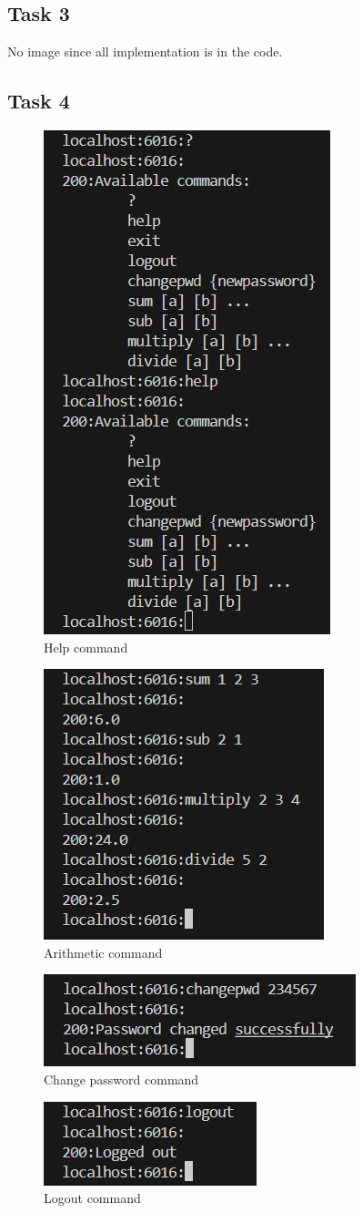 \documentclass[a4paper,12pt]{article}
\begin{document}
\subsection{Task 3}

No image since all implementation is in the code.

\subsection{Task 4}

\begin{figure}[H]
    \centering
    \includegraphics[width=0.3\linewidth]{figure/help.png}
    \caption{Help command}
\end{figure}

\begin{figure}[H]
    \centering
    \includegraphics[width=0.3\linewidth]{figure/arithmetic.png}
    \caption{Arithmetic command}
\end{figure}

\begin{figure}[H]
    \centering
    \includegraphics[width=0.3\linewidth]{figure/changepwd.png}
    \caption{Change password command}
\end{figure}

\begin{figure}[H]
    \centering
    \includegraphics[width=0.3\linewidth]{figure/logout.png}
    \caption{Logout command}
\end{figure}
\end{document}
